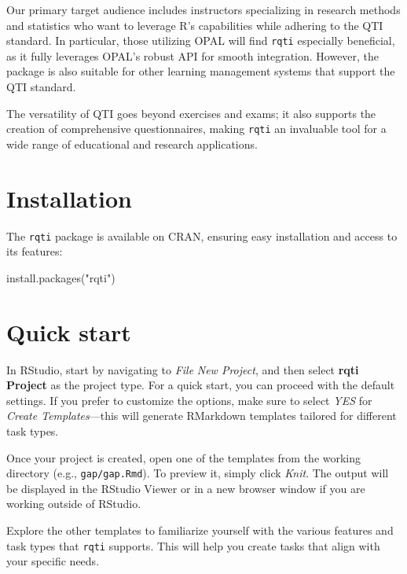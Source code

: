 \documentclass[twoside]{tufte-book}
\newenvironment{Shaded}{}{}
\newcommand{\FunctionTok}[1]{\textcolor[rgb]{0.02,0.16,0.49}{#1}}
\newcommand{\NormalTok}[1]{#1}
\newcommand{\StringTok}[1]{\textcolor[rgb]{0.25,0.44,0.63}{#1}}
\begin{document}
Our primary target audience includes instructors specializing in research methods and statistics who want to leverage R's capabilities while adhering to the QTI standard. In particular, those utilizing OPAL will find \texttt{rqti} especially beneficial, as it fully leverages OPAL's robust API for smooth integration. However, the package is also suitable for other learning management systems that support the QTI standard.

The versatility of QTI goes beyond exercises and exams; it also supports the creation of comprehensive questionnaires, making \texttt{rqti} an invaluable tool for a wide range of educational and research applications.

\section{Installation}\label{installation}

The \texttt{rqti} package is available on CRAN, ensuring easy installation and access to its features:

\begin{Shaded}
\begin{Highlighting}[]
\FunctionTok{install.packages}\NormalTok{(}\StringTok{"rqti"}\NormalTok{)}
\end{Highlighting}
\end{Shaded}

\section{Quick start}\label{quick-start}

In RStudio, start by navigating to \emph{File} \textrightarrow{} \emph{New Project}, and then select \textbf{rqti Project} as the project type. For a quick start, you can proceed with the default settings. If you prefer to customize the options, make sure to select \emph{YES} for \emph{Create Templates}---this will generate RMarkdown templates tailored for different task types.

Once your project is created, open one of the templates from the working directory (e.g., \texttt{gap/gap.Rmd}). To preview it, simply click \emph{Knit}. The output will be displayed in the RStudio Viewer or in a new browser window if you are working outside of RStudio.

Explore the other templates to familiarize yourself with the various features and task types that \texttt{rqti} supports. This will help you create tasks that align with your specific needs.
\end{document}
